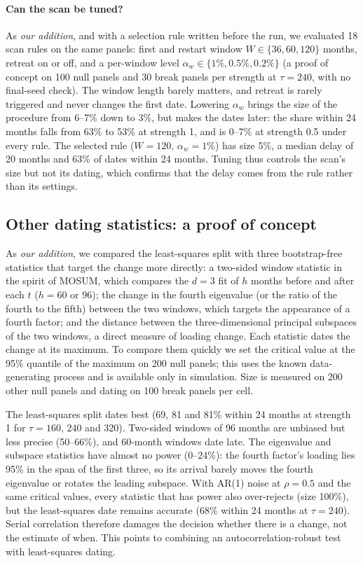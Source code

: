 \documentclass[11pt]{article}
\begin{document}
\paragraph{Can the scan be tuned?} As \emph{our addition}, and with a selection rule written before the run, we evaluated 18 scan rules on the same panels: first and restart window $W\in\{36,60,120\}$ months, retreat on or off, and a per-window level $\alpha_w\in\{1\%,0.5\%,0.2\%\}$ (a proof of concept on 100 null panels and 30 break panels per strength at $\tau=240$, with no final-seed check). The window length barely matters, and retreat is rarely triggered and never changes the first date. Lowering $\alpha_w$ brings the size of the procedure from 6--7\% down to 3\%, but makes the dates later: the share within 24 months falls from 63\% to 53\% at strength 1, and is 0--7\% at strength 0.5 under every rule. The selected rule ($W=120$, $\alpha_w=1\%$) has size 5\%, a median delay of 20 months and 63\% of dates within 24 months. Tuning thus controls the scan's size but not its dating, which confirms that the delay comes from the rule rather than its settings.

\subsection*{Other dating statistics: a proof of concept}\label{sec.newstat}

As \emph{our addition}, we compared the least-squares split with three bootstrap-free statistics that target the change more directly: a two-sided window statistic in the spirit of MOSUM, which compares the $d=3$ fit of $h$ months before and after each $t$ ($h=60$ or 96); the change in the fourth eigenvalue (or the ratio of the fourth to the fifth) between the two windows, which targets the appearance of a fourth factor; and the distance between the three-dimensional principal subspaces of the two windows, a direct measure of loading change. Each statistic dates the change at its maximum. To compare them quickly we set the critical value at the 95\% quantile of the maximum on 200 null panels; this uses the known data-generating process and is available only in simulation. Size is measured on 200 other null panels and dating on 100 break panels per cell.

The least-squares split dates best (69, 81 and 81\% within 24 months at strength 1 for $\tau=160$, 240 and 320). Two-sided windows of 96 months are unbiased but less precise (50--66\%), and 60-month windows date late. The eigenvalue and subspace statistics have almost no power (0--24\%): the fourth factor's loading lies 95\% in the span of the first three, so its arrival barely moves the fourth eigenvalue or rotates the leading subspace. With AR(1) noise at $\rho=0.5$ and the same critical values, every statistic that has power also over-rejects (size 100\%), but the least-squares date remains accurate (68\% within 24 months at $\tau=240$). Serial correlation therefore damages the decision whether there is a change, not the estimate of when. This points to combining an autocorrelation-robust test with least-squares dating.
\end{document}
